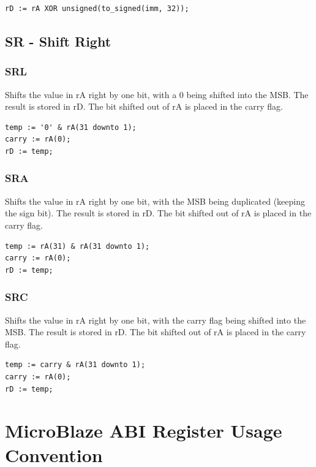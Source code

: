 \documentclass{UoYCSproject}
\begin{document}
\begin{lstlisting}
rD := rA XOR unsigned(to_signed(imm, 32));
\end{lstlisting}

\section{SR - Shift Right}

\subsection{SRL}

Shifts the value in rA right by one bit, with a 0 being shifted into the MSB. The result is stored in rD.
The bit shifted out of rA is placed in the carry flag.

\begin{lstlisting}
temp := '0' & rA(31 downto 1);
carry := rA(0);
rD := temp;
\end{lstlisting}

\subsection{SRA}

Shifts the value in rA right by one bit, with the MSB being duplicated (keeping the sign bit). The result is stored in rD.
The bit shifted out of rA is placed in the carry flag.

\begin{lstlisting}
temp := rA(31) & rA(31 downto 1);
carry := rA(0);
rD := temp;
\end{lstlisting}

\subsection{SRC}

Shifts the value in rA right by one bit, with the carry flag being shifted into the MSB. The result is stored in rD.
The bit shifted out of rA is placed in the carry flag.

\begin{lstlisting}
temp := carry & rA(31 downto 1);
carry := rA(0);
rD := temp;
\end{lstlisting}

\chapter{MicroBlaze ABI Register Usage Convention}
\label{appendix:abi}
\end{document}

